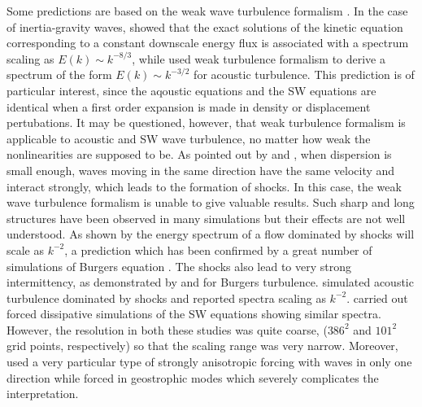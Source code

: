 \documentclass{jfm}
\begin{document}
Some predictions are based on the weak wave turbulence formalism
\cite[]{ZakharovLvovFalkovich1992, Nazarenko2011}. In the case of
inertia-gravity waves, \cite{FalkovichMedvedev1992} showed that the exact
solutions of the kinetic equation corresponding to a constant downscale energy
flux is associated with a spectrum scaling as $E(k) \sim k^{-8/3}$, while
\cite{ZakharovSagdeev1970} used weak turbulence formalism to derive a spectrum
of the form $ E(k) \sim k^{-3/2} $ for acoustic turbulence. This prediction is
of particular interest, since the aqoustic equations and the SW equations are
identical when a first order expansion is made in density or displacement
pertubations. It may be questioned, however, that weak turbulence formalism is
applicable to acoustic and SW wave turbulence, no matter how weak the
nonlinearities are supposed to be. As pointed out by \cite{KadomtsevPet1970}
and \cite{FalkovichMeyer1996}, when dispersion is small enough, waves moving in
the same direction have the same velocity and interact strongly, which leads to
the formation of shocks. In this case, the weak wave turbulence formalism is
unable to give valuable results. Such sharp and long structures have been
observed in many simulations \cite[]{FargeSadourny1989,
PolvaniMcWilliamsSpallFord1994, LahayeZeitlin2012} but their effects are not
well understood.
%
As shown by \cite{Burgers1948} the energy spectrum of a flow dominated by
shocks will scale as $ k^{-2} $, a prediction which has been confirmed by a
great number of simulations of Burgers equation \cite[for a review, see ]
[]{Frisch2001}. The shocks also lead to very strong intermittency, as
demonstrated by \cite{BouchaudMezardParisi1995} and
\cite{WeinanKhaninMazelSinai1997} for Burgers turbulence.
%
\cite{FalkovichMeyer1996} simulated acoustic turbulence dominated by shocks
and reported spectra scaling as $ k^{-2} $.
\cite{YuanHamilton1994} carried out
forced dissipative simulations of the SW equations showing similar spectra.
However, the resolution in both these studies was quite coarse, ($386^2$
and $101^2$ grid points, respectively) so that the scaling range was very
narrow.  Moreover, \cite{FalkovichMeyer1996} used a very particular
type of strongly anisotropic forcing with waves in only one
direction while \cite{YuanHamilton1994} forced in geostrophic modes
which severely complicates the interpretation.
\end{document}
